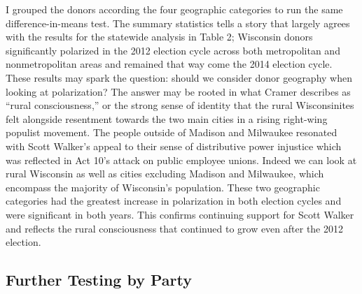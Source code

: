 \documentclass[10pt,]{article}
\begin{document}
I grouped the donors according the four geographic categories to run the
same difference-in-means test. The summary statistics tells a story that
largely agrees with the results for the statewide analysis in Table 2;
Wisconsin donors significantly polarized in the 2012 election cycle
across both metropolitan and nonmetropolitan areas and remained that way
come the 2014 election cycle. These results may spark the question:
should we consider donor geography when looking at polarization? The
answer may be rooted in what Cramer describes as ``rural
consciousness,'' or the strong sense of identity that the rural
Wisconsinites felt alongside resentment towards the two main cities in a
rising right-wing populist movement. The people outside of Madison and
Milwaukee resonated with Scott Walker's appeal to their sense of
distributive power injustice which was reflected in Act 10's attack on
public employee unions. Indeed we can look at rural Wisconsin as well as
cities excluding Madison and Milwaukee, which encompass the majority of
Wisconsin's population. These two geographic categories had the greatest
increase in polarization in both election cycles and were significant in
both years. This confirms continuing support for Scott Walker and
reflects the rural consciousness that continued to grow even after the
2012 election.

\hypertarget{further-testing-by-party}{%
\subsection{Further Testing by Party}\label{further-testing-by-party}}
\end{document}

